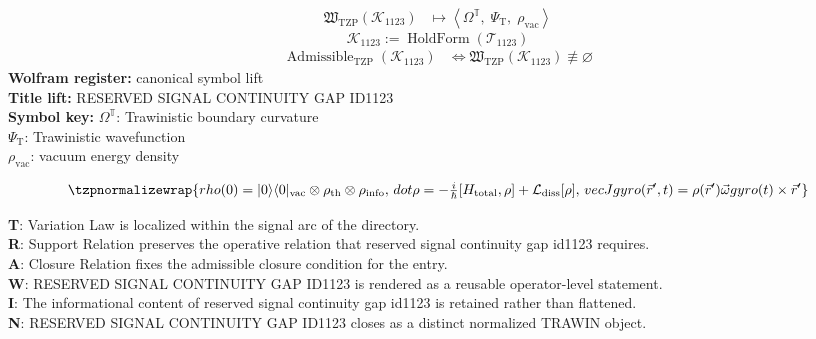 \noindent
\begin{minipage}[t]{0.48\linewidth}
\begingroup
\small
\[
\begin{aligned}
\mathfrak{W}_{\mathrm{TZP}}\!\left(\mathcal{K}_{1123}\right)
&\longmapsto
\left\langle \Omega^{\mathbb{T}},\; \Psi_{\mathrm{T}},\; \rho_{\mathrm{vac}} \right\rangle
\end{aligned}
\]
\[
\mathcal{K}_{1123}
:=
\operatorname{HoldForm}\!\left(\mathcal{T}_{1123}\right)
\]
\[
\begin{aligned}
\operatorname{Admissible}_{\mathrm{TZP}}\!\left(\mathcal{K}_{1123}\right)
&\Longleftrightarrow
\mathfrak{W}_{\mathrm{TZP}}\!\left(\mathcal{K}_{1123}\right)\not\equiv\varnothing
\end{aligned}
\]
\textbf{Wolfram register:} canonical symbol lift\\
\textbf{Title lift:} RESERVED SIGNAL CONTINUITY GAP ID1123\\
\textbf{Symbol key:} \(\Omega^{\mathbb{T}}\): Trawinistic boundary curvature\\ \(\Psi_{\mathrm{T}}\): Trawinistic wavefunction\\ \(\rho_{\mathrm{vac}}\): vacuum energy density
\par
\endgroup
\end{minipage}\hfill
\begin{minipage}[t]{0.48\linewidth}
\[
\tzpnormalizewrap{rho(0)=|0\rangle\langle0|_{\rm vac}\otimes\rho_{\rm th}\otimes\rho_{\rm info},\,dot\rho = -\tfrac{i}{\hbar}[H_{\rm total},\rho]+\mathcal L_{\rm diss}[\rho],\,vec{J} {gyro}(\vec{r}^{\prime},t) = \rho(\vec{r}^{\prime})\vec{\omega} {gyro}(t)\times\vec{r}^{\prime}}
\]

\small
\textbf{T}: Variation Law is localized within the signal arc of the directory.\\
\textbf{R}: Support Relation preserves the operative relation that reserved signal continuity gap id1123 requires.\\
\textbf{A}: Closure Relation fixes the admissible closure condition for the entry.\\
\textbf{W}: RESERVED SIGNAL CONTINUITY GAP ID1123 is rendered as a reusable operator-level statement.\\
\textbf{I}: The informational content of reserved signal continuity gap id1123 is retained rather than flattened.\\
\textbf{N}: RESERVED SIGNAL CONTINUITY GAP ID1123 closes as a distinct normalized TRAWIN object.
\normalsize
\end{minipage}

